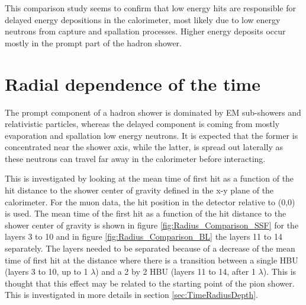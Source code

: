 This comparison study seems to confirm that low energy hits are responsible for delayed energy depositions in the calorimeter, most likely due to low energy neutrons from capture and spallation processes. Higher energy deposits occur mostly in the prompt part of the hadron shower.

\section{Radial dependence of the time}
\label{sec:RadialTime}

The prompt component of a hadron shower is dominated by EM sub-showers and relativistic particles, whereas the delayed component is coming from mostly evaporation and spallation low energy neutrons. It is expected that the former is concentrated near the shower axis, while the latter, is spread out laterally as these neutrons can travel far away in the calorimeter before interacting.

This is investigated by looking at the mean time of first hit as a function of the hit distance to the shower center of gravity defined in the x-y plane of the calorimeter. For the muon data, the hit position in the detector relative to (0,0) is used. The mean time of the first hit as a function of the hit distance to the shower center of gravity is shown in figure \ref{fig:Radius_Comparison_SSF} for the layers 3 to 10 and in figure \ref{fig:Radius_Comparison_BL} the layers 11 to 14 separately. The layers needed to be separated because of a decrease of the mean time of first hit at the distance where there is a transition between a single HBU (layers 3 to 10, up to 1 $\lambda$) and a 2 by 2 HBU (layers 11 to 14, after 1 $\lambda$). This is thought that this effect may be related to the starting point of the pion shower. This is investigated in more details in section \ref{sec:TimeRadiusDepth}.

